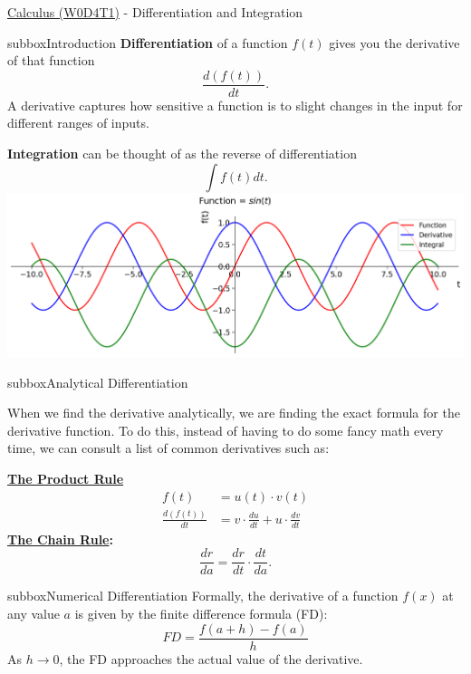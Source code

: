 \clearpage
\begin{textbox}{\href{https://compneuro.neuromatch.io/tutorials/W0D4_Calculus/student/W0D4_Tutorial1.html}{Calculus (W0D4T1)} - Differentiation and Integration}
\begin{subbox}{subbox}{Introduction}
\scriptsize
\textbf{Differentiation} of a function $f(t)$ gives you the derivative of that function \begin{equation} \frac{d(f(t))}{dt}.
\end{equation} A derivative captures how sensitive a function is to slight changes in the input for different ranges of inputs. 

\textbf{Integration} can be thought of as the reverse of differentiation
\begin{equation}
\int f(t)dt.
\end{equation}
\centering
\includegraphics[scale=0.2]{Figures/PreCourse/CFigure1.png}
\end{subbox}

\begin{subbox}{subbox}{Analytical Differentiation}
\scriptsize{
When we find the derivative analytically, we are finding the exact formula for the derivative function. 
To do this, instead of having to do some fancy math every time, we can consult a list of common derivatives such as:

\textbf{ \href{https://en.wikipedia.org/wiki/Product_rule}{The Product Rule}}
\begin{align}
f(t) &= u(t)\cdot v(t) \\
\frac{d(f(t))}{dt} &= v\cdot \frac{du}{dt} + u\cdot \frac{dv}{dt}
\end{align}
\textbf{\href{https://en.wikipedia.org/wiki/Chain_rule}{The Chain Rule}:}
\begin{equation}
\frac{dr}{da} = \frac{dr}{dt}\cdot\frac{dt}{da}.
\end{equation}
}
\end{subbox}
\begin{subbox}{subbox}{Numerical Differentiation}
\scriptsize{Formally, the derivative of a function $f(x)$ at any value $a$ is given by the finite difference formula (FD): 
\begin{equation}
FD = \frac{f(a+h) - f(a)}{h}
\end{equation}
As $h\rightarrow 0$, the FD approaches the actual value of the derivative.}


\end{subbox}
\end{textbox}
